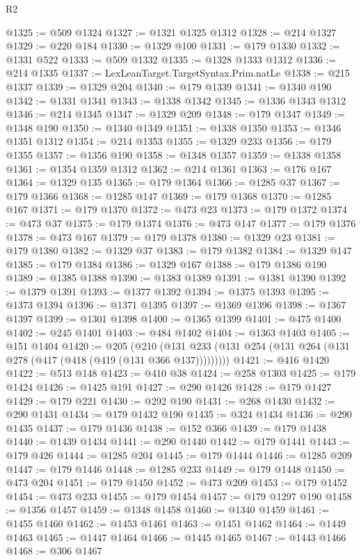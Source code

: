 \begin{lexlean}{R2}
\begin{coremodule}
@1325 := @509 @1324
@1327 := @1321 @1325 @1312
@1328 := @214 @1327
@1329 := @220 @184
@1330 := @1329 @100
@1331 := @179 @1330
@1332 := @1331 @522
@1333 := @509 @1332
@1335 := @1328 @1333 @1312
@1336 := @214 @1335
@1337 := LexLeanTarget.TargetSyntax.Prim.natLe
@1338 := @215 @1337
@1339 := @1329 @204
@1340 := @179 @1339
@1341 := @1340 @190
@1342 := @1331 @1341
@1343 := @1338 @1342
@1345 := @1336 @1343 @1312
@1346 := @214 @1345
@1347 := @1329 @209
@1348 := @179 @1347
@1349 := @1348 @190
@1350 := @1340 @1349
@1351 := @1338 @1350
@1353 := @1346 @1351 @1312
@1354 := @214 @1353
@1355 := @1329 @233
@1356 := @179 @1355
@1357 := @1356 @190
@1358 := @1348 @1357
@1359 := @1338 @1358
@1361 := @1354 @1359 @1312
@1362 := @214 @1361
@1363 := @176 @167
@1364 := @1329 @135
@1365 := @179 @1364
@1366 := @1285 @37
@1367 := @179 @1366
@1368 := @1285 @147
@1369 := @179 @1368
@1370 := @1285 @167
@1371 := @179 @1370
@1372 := @473 @23
@1373 := @179 @1372
@1374 := @473 @37
@1375 := @179 @1374
@1376 := @473 @147
@1377 := @179 @1376
@1378 := @473 @167
@1379 := @179 @1378
@1380 := @1329 @23
@1381 := @179 @1380
@1382 := @1329 @37
@1383 := @179 @1382
@1384 := @1329 @147
@1385 := @179 @1384
@1386 := @1329 @167
@1388 := @179 @1386 @190
@1389 := @1385 @1388
@1390 := @1383 @1389
@1391 := @1381 @1390
@1392 := @1379 @1391
@1393 := @1377 @1392
@1394 := @1375 @1393
@1395 := @1373 @1394
@1396 := @1371 @1395
@1397 := @1369 @1396
@1398 := @1367 @1397
@1399 := @1301 @1398
@1400 := @1365 @1399
@1401 := @475 @1400
@1402 := @245 @1401
@1403 := @484 @1402
@1404 := @1363 @1403
@1405 := @151 @1404
@1420 := @205
    (@210 (@131 @233 (@131 @254 (@131 @264 (@131 @278 (@417 (@418 (@419 (@131 @366 @137)))))))))
@1421 := @416 @1420
@1422 := @513 @148
@1423 := @410 @38
@1424 := @258 @1303
@1425 := @179 @1424
@1426 := @1425 @191
@1427 := @290 @1426
@1428 := @179 @1427
@1429 := @179 @221
@1430 := @292 @190
@1431 := @268 @1430
@1432 := @290 @1431
@1434 := @179 @1432 @190
@1435 := @324 @1434
@1436 := @290 @1435
@1437 := @179 @1436
@1438 := @152 @366
@1439 := @179 @1438
@1440 := @1439 @1434
@1441 := @290 @1440
@1442 := @179 @1441
@1443 := @179 @426
@1444 := @1285 @204
@1445 := @179 @1444
@1446 := @1285 @209
@1447 := @179 @1446
@1448 := @1285 @233
@1449 := @179 @1448
@1450 := @473 @204
@1451 := @179 @1450
@1452 := @473 @209
@1453 := @179 @1452
@1454 := @473 @233
@1455 := @179 @1454
@1457 := @179 @1297 @190
@1458 := @1356 @1457
@1459 := @1348 @1458
@1460 := @1340 @1459
@1461 := @1455 @1460
@1462 := @1453 @1461
@1463 := @1451 @1462
@1464 := @1449 @1463
@1465 := @1447 @1464
@1466 := @1445 @1465
@1467 := @1443 @1466
@1468 := @306 @1467

\end{coremodule}
\end{lexlean}
